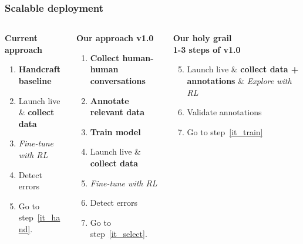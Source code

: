 \documentclass[10pt, compress,british,xcolor={svgnames,dvipsnames,x11names},trans]{beamer}
\begin{document}
\begin{frame}\frametitle{Scalable deployment}
\begin{columns}
\begin{column}{0.33\textwidth}
    {\bf Current approach } \\
    \begin{enumerate}
        \item\label{it_hand} {\bf \color{red} Handcraft baseline}
        \item Launch live \& {\bf collect data}
        \item {\it Fine-tune with RL}
        \item Detect errors
        \item Go to step~\ref{it_hand}.
    \end{enumerate}
\end{column}
\begin{column}{0.33\textwidth}
    {\bf Our approach v1.0 } \\
    \begin{enumerate}
        \item {\bf \color{darkgreen} Collect human-human conversations}
        \item\label{it_select} {\bf \color{darkgreen} Annotate relevant data}
        \item\label{it_train} {\bf \color{darkgreen} Train model}
        \item Launch live \& {\bf collect data}
        \item {\it Fine-tune with RL}
        \item Detect errors
        \item Go to step~\ref{it_select}.
    \end{enumerate}
\end{column}
\begin{column}{0.33\textwidth}
    {\bf Our holy grail } \\
    {\bf \color{darkgreen} 1-3 steps of v1.0} \\
    \begin{enumerate}
        \setcounter{enumi}{4}
        \item Launch live \& {\bf collect data + annotations} \& {\it Explore with RL}
        \item Validate annotations
        \item Go to step~\ref{it_train}
    \end{enumerate}
\end{column}
\end{columns}
\end{frame}
\end{document}
